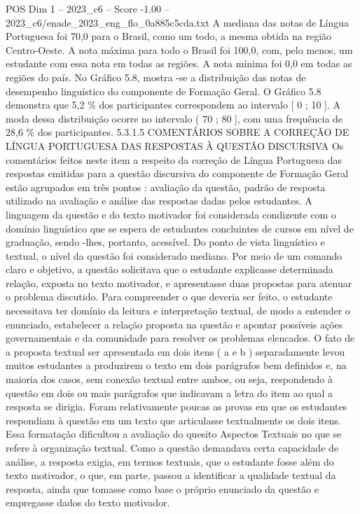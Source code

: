 \begin{textsample}{POS Dim 1 – 2023\_c6 – Score -1.00 – 2023\_c6/enade\_2023\_eng\_flo\_0a885c5cda.txt}
A mediana das notas de Língua Portuguesa foi 70,0 para o Brasil, como um todo, a mesma obtida na região Centro-Oeste.
A nota máxima para todo o Brasil foi 100,0, com, pelo menos, um estudante com essa nota em todas as regiões.
A nota mínima foi 0,0 em todas as regiões do país.
No Gráfico 5.8, mostra -se a distribuição das notas de desempenho linguístico do componente de Formação Geral.
O Gráfico 5.8 demonstra que 5,2 \% dos participantes correspondem ao intervalo [ 0 ; 10 ].
A moda dessa distribuição ocorre no intervalo ( 70 ; 80 ], com uma frequência de 28,6 \% dos participantes. 5.3.1.5 COMENTÁRIOS SOBRE A CORREÇÃO DE LÍNGUA PORTUGUESA DAS RESPOSTAS À QUESTÃO DISCURSIVA Os comentários feitos neste item a respeito da correção de Língua Portuguesa das respostas emitidas para a questão discursiva do componente de Formação Geral estão agrupados em três pontos : avaliação da questão, padrão de resposta utilizado na avaliação e análise das respostas dadas pelos estudantes.
A linguagem da questão e do texto motivador foi considerada condizente com o domínio linguístico que se espera de estudantes concluintes de cursos em nível de graduação, sendo -lhes, portanto, acessível.
Do ponto de vista linguístico e textual, o nível da questão foi considerado mediano.
Por meio de um comando claro e objetivo, a questão solicitava que o estudante explicasse determinada relação, exposta no texto motivador, e apresentasse duas propostas para atenuar o problema discutido.
Para compreender o que deveria ser feito, o estudante necessitava ter domínio da leitura e interpretação textual, de modo a entender o enunciado, estabelecer a relação proposta na questão e apontar possíveis ações governamentais e da comunidade para resolver os problemas elencados.
O fato de a proposta textual ser apresentada em dois itens ( a e b ) separadamente levou muitos estudantes a produzirem o texto em dois parágrafos bem definidos e, na maioria dos casos, sem conexão textual entre ambos, ou seja, respondendo à questão em dois ou mais parágrafos que indicavam a letra do item ao qual a resposta se dirigia.
Foram relativamente poucas as provas em que os estudantes respondiam à questão em um texto que articulasse textualmente os dois itens.
Essa formatação dificultou a avaliação do quesito Aspectos Textuais no que se refere à organização textual.
Como a questão demandava certa capacidade de análise, a resposta exigia, em termos textuais, que o estudante fosse além do texto motivador, o que, em parte, passou a identificar a qualidade textual da resposta, ainda que tomasse como base o próprio enunciado da questão e empregasse dados do texto motivador.

\end{textsample}
